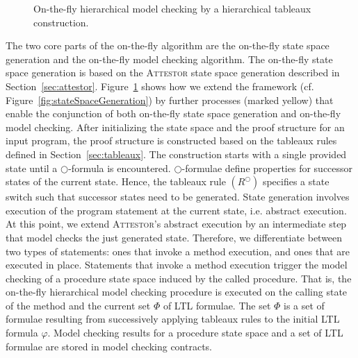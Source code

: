 \documentclass[a4paper, 12pt, twoside]{report}
\begin{document}
\begin{figure}
\begin{center}
{}
			\caption{On-the-fly hierarchical model checking by a hierarchical tableaux construction.}\label{fig:otfHMC}
		\end{center}
	\end{figure}	
	
	The two core parts of the on-the-fly algorithm are the on-the-fly state space generation and the on-the-fly model checking algorithm.	The on-the-fly state space generation is based on the \textsc{Attestor} state space generation described in Section~\ref{sec:attestor}. Figure~\ref{fig:otfHMC} shows how we extend the framework (cf. Figure~\ref{fig:stateSpaceGeneration}) by further processes (marked yellow) that enable the conjunction of both on-the-fly state space generation and on-the-fly model checking. After initializing the state space and the proof structure for an input program, the proof structure is constructed based on the tableaux rules defined in Section~\ref{sec:tableaux}. The construction starts with a single provided state until a $\bigcirc$-formula is encountered. $\bigcirc$-formulae define properties for successor states of the current state. Hence, the tableaux rule $(R^{\bigcirc})$ specifies a state switch such that successor states need to be generated. State generation involves execution of the program statement at the current state, i.e. abstract execution. At this point, we extend \textsc{Attestor}'s abstract execution by an intermediate step that model checks the just generated state. Therefore, we differentiate between two types of statements: ones that invoke a method execution, and ones that are executed in place. Statements that invoke a method execution trigger the model checking of a procedure state space induced by the called procedure. That is, the on-the-fly hierarchical model checking procedure is executed on the calling state of the method and the current set $\Phi$ of LTL formulae. The set $\Phi$ is a set of formulae resulting from successively applying tableaux rules to the initial LTL formula $\varphi$. Model checking results for a procedure state space and a set of LTL formulae are stored in model checking contracts.\\
	
\end{document}
